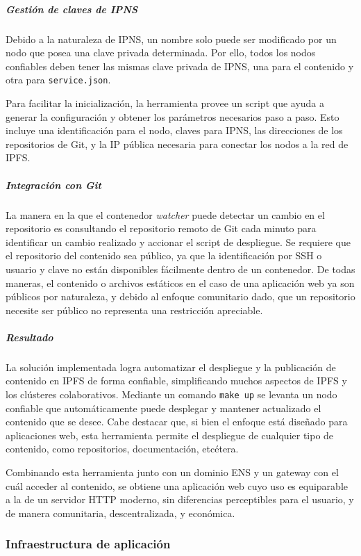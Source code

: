 \subparagraph{Gestión de claves de IPNS}

Debido a la naturaleza de IPNS, un nombre solo puede ser modificado por un nodo que posea una clave privada determinada. Por ello, todos los nodos confiables deben tener las mismas clave privada de IPNS, una para el contenido y otra para \texttt{service.json}.

Para facilitar la inicialización, la herramienta provee un script que ayuda a generar la configuración y obtener los parámetros necesarios paso a paso. Esto incluye una identificación para el nodo, claves para IPNS, las direcciones de los repositorios de Git, y la IP pública necesaria para conectar los nodos a la red de IPFS.

\subparagraph{Integración con Git}

La manera en la que el contenedor \textit{watcher} puede detectar un cambio en el repositorio es consultando el repositorio remoto de Git cada minuto para identificar un cambio realizado y accionar el script de despliegue. Se requiere que el repositorio del contenido sea público, ya que la identificación por SSH o usuario y clave no están disponibles fácilmente dentro de un contenedor. De todas maneras, el contenido o archivos estáticos en el caso de una aplicación web ya son públicos por naturaleza, y debido al enfoque comunitario dado, que un repositorio necesite ser público no representa una restricción apreciable.

\subparagraph{Resultado}

La solución implementada logra automatizar el despliegue y la publicación de contenido en IPFS de forma confiable, simplificando muchos aspectos de IPFS y los clústeres colaborativos. Mediante un comando \texttt{make up} se levanta un nodo confiable que automáticamente puede desplegar y mantener actualizado el contenido que se desee. Cabe destacar que, si bien el enfoque está diseñado para aplicaciones web, esta herramienta permite el despliegue de cualquier tipo de contenido, como repositorios, documentación, etcétera.

Combinando esta herramienta junto con un dominio ENS y un gateway con el cuál acceder al contenido, se obtiene una aplicación web cuyo uso es equiparable a la de un servidor HTTP moderno, sin diferencias perceptibles para el usuario, y de manera comunitaria, descentralizada, y económica.

\subsubsection{Infraestructura de aplicación}

